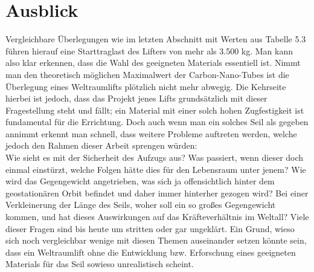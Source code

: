 \documentclass[a4paper, 10pt]{report}
\begin{document}
\section{Ausblick}
Vergleichbare Überlegungen wie im letzten Abschnitt mit Werten aus Tabelle 5.3 führen hierauf eine Starttraglast des Lifters von mehr als 3.500 kg. Man kann also klar erkennen, dass die Wahl des geeigneten Materials essentiell ist. Nimmt man den theoretisch möglichen Maximalwert der Carbon-Nano-Tubes ist die Überlegung eines Weltraumlifts plötzlich nicht mehr abwegig. Die Kehrseite hierbei ist jedoch, dass das Projekt jenes Lifts grundsätzlich mit dieser Fragestellung steht und fällt; ein Material mit einer solch hohen Zugfestigkeit ist fundamental für die Errichtung. Doch auch wenn man ein solches Seil als gegeben annimmt erkennt man schnell, dass weitere Probleme auftreten werden, welche jedoch den Rahmen dieser Arbeit sprengen würden:\\
Wie sieht es mit der Sicherheit des Aufzugs aus? Was passiert, wenn dieser doch einmal einstürzt, welche Folgen hätte dies für den Lebensraum unter jenem? Wie wird das Gegengewicht angetrieben, was sich ja offensichtlich hinter dem geostationären Orbit befindet und daher immer hinterher gezogen wird? Bei einer Verkleinerung der Länge des Seils, woher soll ein so großes Gegengewicht kommen, und hat dieses Auswirkungen auf das Kräfteverhältnis im Weltall? Viele dieser Fragen sind bis heute um stritten oder gar ungeklärt. Ein Grund, wieso sich noch vergleichbar wenige mit diesen Themen auseinander setzen könnte sein, dass ein Weltraumlift ohne die Entwicklung bzw. Erforschung eines geeigneten Materials für das Seil sowieso unrealistisch scheint. 

{}

\end{document}
